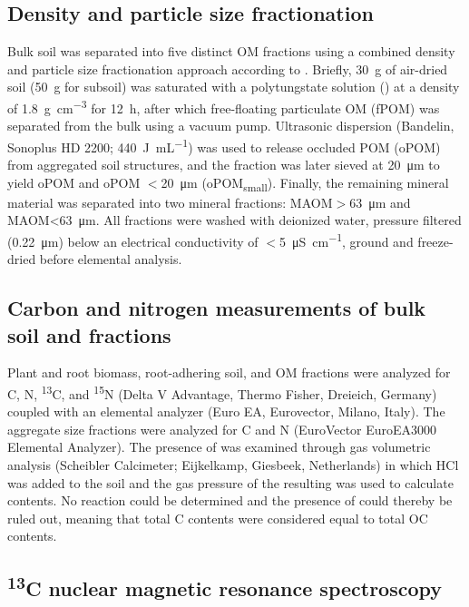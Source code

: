 \subsection{Density and particle size fractionation}

Bulk soil was separated into five distinct OM fractions using a combined density and particle size fractionation approach according to \citet{Mueller2009}. Briefly, \SI{30}{\gram} of air-dried soil (\SI{50}{\gram} for subsoil) was saturated with a polytungstate solution () at a density of \SI{1.8}{\gram\per\centi\metre\cubed} for \SI{12}{\hour}, after which free-floating particulate OM (fPOM) was separated from the bulk using a vacuum pump. Ultrasonic dispersion (Bandelin, Sonoplus HD 2200; \SI{440}{\joule\per\milli\liter}) was used to release occluded POM (oPOM) from aggregated soil structures, and the fraction was later sieved at \SI{20}{\micro\metre} to yield oPOM and oPOM $<$\SI{20}{\micro\metre} (oPOM\textsubscript{small}). Finally, the remaining mineral material was separated into two mineral fractions: MAOM$>$\SI{63}{\micro\metre} and MAOM<\SI{63}{\micro\metre}. All fractions were washed with deionized water, pressure filtered (\SI{0.22}{\micro\metre}) below an electrical conductivity of $<$\SI{5}{\micro\siemens\per\centi\metre}, ground and freeze-dried before elemental analysis.

\subsection{Carbon and nitrogen measurements of bulk soil and fractions}

Plant and root biomass, root-adhering soil, and OM fractions were analyzed for C, N, \textsuperscript{13}C, and \textsuperscript{15}N (Delta V Advantage, Thermo Fisher, Dreieich, Germany) coupled with an elemental analyzer (Euro EA, Eurovector, Milano, Italy). The aggregate size fractions were analyzed for C and N (EuroVector EuroEA3000 Elemental Analyzer). The presence of  was examined through gas volumetric analysis (Scheibler Calcimeter; Eijkelkamp, Giesbeek, Netherlands) in which HCl was added to the soil and the gas pressure of the resulting  was used to calculate  contents. No reaction could be determined and the presence of  could thereby be ruled out, meaning that total C contents were considered equal to total OC contents.

\subsection{\textsuperscript{13}C nuclear magnetic resonance spectroscopy}

